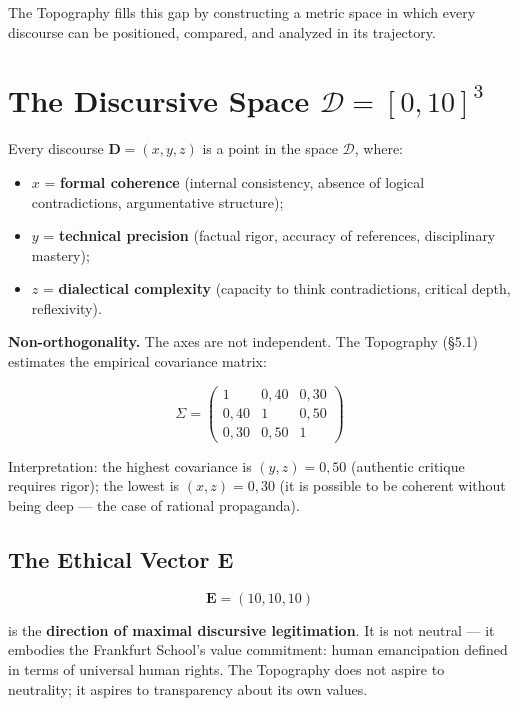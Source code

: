 The Topography fills this gap by constructing a metric space in which
every discourse can be positioned, compared, and analyzed in its
trajectory.

\section{\texorpdfstring{The Discursive Space
\(\mathcal{D} = [0, 10]^3\)}{The Discursive Space \textbackslash mathcal\{D\} = {[}0, 10{]}\^{}3}}\label{discursive-space-d}

Every discourse \(\mathbf{D} = (x, y, z)\) is a point in the space
\(\mathcal{D}\), where:

\begin{itemize}
\tightlist
\item
  \(x\) = \textbf{formal coherence} (internal consistency, absence of
  logical contradictions, argumentative structure);
\item
  \(y\) = \textbf{technical precision} (factual rigor, accuracy of
  references, disciplinary mastery);
\item
  \(z\) = \textbf{dialectical complexity} (capacity to think
  contradictions, critical depth, reflexivity).
\end{itemize}

\Hypoth{} \textbf{Non-orthogonality.} The axes are not independent. The
Topography (\S{}5.1) estimates the empirical covariance matrix:

\[
\Sigma = \begin{pmatrix} 1 & 0{,}40 & 0{,}30 \\ 0{,}40 & 1 & 0{,}50 \\ 0{,}30 & 0{,}50 & 1 \end{pmatrix}
\]

\Proved{} Interpretation: the highest covariance is \((y, z) = 0{,}50\)
(authentic critique requires rigor); the lowest is \((x, z) = 0{,}30\)
(it is possible to be coherent without being deep --- the case of
rational propaganda).

\subsection{\texorpdfstring{The Ethical Vector
\(\mathbf{E}\)}{The Ethical Vector \textbackslash mathbf\{E\}}}\label{ethical-vector}

\[
\mathbf{E} = (10, 10, 10)
\]

is the \textbf{direction of maximal discursive legitimation}. It is not
neutral --- it embodies the Frankfurt School's value commitment: human
emancipation defined in terms of universal human rights. The Topography
does not aspire to neutrality; it aspires to transparency about its own
values.

